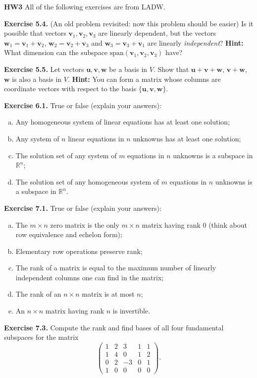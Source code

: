 \documentclass{article}
\begin{document}

\textbf{HW3}
All of the following exercises are from LADW.

\textbf{Exercise 5.4.} (An old problem revisited: now this problem should be easier) Is it possible that vectors $\mathbf{v}_1, \mathbf{v}_2, \mathbf{v}_3$ are linearly dependent, but the vectors $\mathbf{w}_1 = \mathbf{v}_1 + \mathbf{v}_2$, $\mathbf{w}_2 = \mathbf{v}_2 + \mathbf{v}_3$ and $\mathbf{w}_3 = \mathbf{v}_3 + \mathbf{v}_1$ are linearly \textit{independent}? \textbf{Hint:} What dimension can the subspace $\text{span}(\mathbf{v}_1, \mathbf{v}_2, \mathbf{v}_3)$ have?
    
\textbf{Exercise 5.5.} Let vectors $\mathbf{u}, \mathbf{v}, \mathbf{w}$ be a basis in $V$. Show that $\mathbf{u} + \mathbf{v} + \mathbf{w}$, $\mathbf{v} + \mathbf{w}$, $\mathbf{w}$ is also a basis in $V$. \textbf{Hint:} You can form a matrix whose columns are coordinate vectors with respect to the basis $\{\mathbf{u}, \mathbf{v}, \mathbf{w}\}$.
    


\textbf{Exercise 6.1.} True or false (explain your answers):

\begin{enumerate}[(a)]
    \item Any homogeneous system of linear equations has at least one solution;
    \item Any system of $n$ linear equations in $n$ unknowns has at least one solution;
    \item The solution set of any system of $m$ equations in $n$ unknowns is a subspace in $\mathbb{R}^n$;
    \item The solution set of any homogeneous system of $m$ equations in $n$ unknowns is a subspace in $\mathbb{R}^n$.
\end{enumerate}

\textbf{Exercise 7.1.} True or false (explain your answers):

\begin{enumerate}[(a)]
    \item The $m \times n$ zero matrix is the only $m \times n$ matrix having rank 0 (think about row equivalence and echelon form);
    \item Elementary row operations preserve rank;
    \item The rank of a matrix is equal to the maximum number of linearly independent columns one can find in the matrix;
    \item The rank of an $n \times n$ matrix is at most $n$;
    \item An $n \times n$ matrix having rank $n$ is invertible.
\end{enumerate}
\textbf{Exercise 7.3.} Compute the rank and find bases of all four fundamental subspaces for the matrix
\[
    \begin{pmatrix}
        1 & 2 & 3 & 1 & 1 \\
        1 & 4 & 0 & 1 & 2 \\
        0 & 2 & -3 & 0 & 1 \\
        1 & 0 & 0 & 0 & 0
    \end{pmatrix}.
\]
\end{document}
